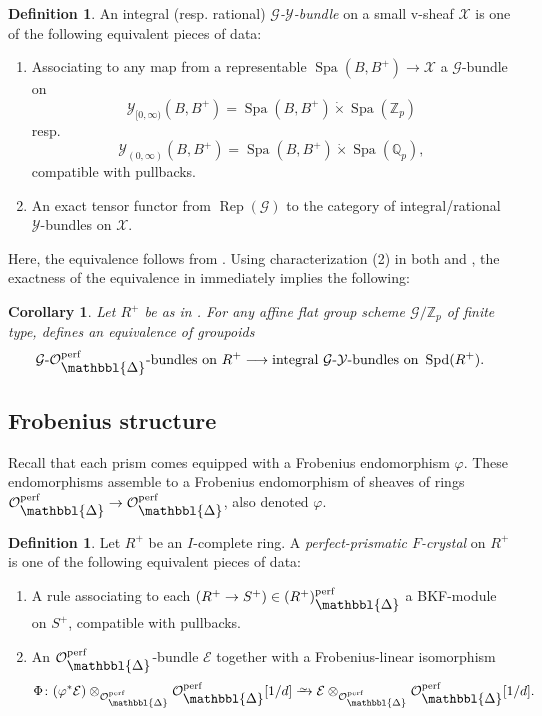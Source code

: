 \documentclass[10pt,twoside]{article}
\numberwithin{equation}{section}
\newcommand\isom{
	\xrightarrow{\smash{\raisebox{-0.65ex}{\ensuremath{\scriptstyle\sim}}}}
}
\theoremstyle{plain}
\newtheorem{mycor}[mythm]{Corollary}
\theoremstyle{definition}
\newtheorem{mydef}[mythm]{Definition}
\DeclareMathOperator{\Spa}{Spa}
\DeclareMathOperator{\Spd}{Spd}
\DeclareMathOperator{\Rep}{Rep}
\newcommand{\ZZ}{\mathbb{Z}}
\newcommand{\QQ}{\mathbb{Q}}
\newcommand{\MCE}{\mathcal{E}}
\newcommand{\MCG}{\mathcal{G}}
\newcommand{\MCO}{\mathcal{O}}
\newcommand{\MCX}{\mathcal{X}}
\newcommand{\MCY}{\mathcal{Y}}
\let \phi \varphi
\DeclareMathOperator{\perf}{perf}
\newcommand{\Prism}{{\mathlarger{\mathbbl{\Delta}}}}
\newcommand{\Yco}{\MCY_{[0,\infty)}}
\newcommand{\Yoo}{\MCY_{(0,\infty)}}
\newcommand{\OpP}{\MCO^{\perf}_{\Prism}}
\begin{document}
\begin{mydef}\label{defGYBundle}
An integral (resp. rational) \emph{\(\MCG\)-\(\MCY\)-bundle} on a small v-sheaf \(\MCX\) is one of the following equivalent pieces of data:
	\begin{enumerate}
		\item Associating to any map from a representable \(\Spa(B,B^+)\to \MCX\) a \(\MCG\)-bundle on 
        \[\Yco(B,B^+)=\Spa(B,B^+)\dot\times\Spa(\ZZ_p)\]
        resp.
        \[\Yoo(B,B^+)=\Spa(B,B^+)\dot\times\Spa(\QQ_p),\]
        compatible with pullbacks.
        \item An exact tensor functor from \(\Rep(\MCG)\) to the category of integral/rational \(\MCY\)-bundles on \(\MCX\).
	\end{enumerate}
\end{mydef}

Here, the equivalence follows from . Using characterization (2) in both  and , the exactness of the equivalence in  immediately implies the following:

\begin{mycor}\label{GEquivalenceTheorem}
Let \(R^+\) be as in . For any affine flat group scheme \(\MCG/\ZZ_p\) of finite type,  defines an equivalence of groupoids
\[\text{\emph{\(\MCG\)-\(\OpP\)-bundles on }}R^+
\longrightarrow\text{\emph{integral \(\MCG\)-\(\MCY\)-bundles on }}\Spd(R^+).\]
\end{mycor}
\subsection{Frobenius structure}
Recall that each prism comes equipped with a Frobenius endomorphism \(\phi\). These endomorphisms assemble to a Frobenius endomorphism of sheaves of rings \(\OpP\to\OpP\), also denoted \(\phi\).

\begin{mydef}
Let \(R^+\) be an \(I\)-complete ring. A \emph{perfect-prismatic \(F\)-crystal} on \(R^+\) is one of the following equivalent pieces of data:
\begin{enumerate}
    \item A rule associating to each \((R^+\to S^+)\in (R^+)_{\Prism}^{\perf}\) a BKF-module on \(S^+\), compatible with pullbacks.
    \item An \(\OpP\)-bundle \(\MCE\) together with a Frobenius-linear isomorphism 
    \[\Phi\colon(\phi^*\MCE)\otimes_{\OpP}\OpP[1/d]\isom \MCE\otimes_{\OpP}\OpP[1/d].\]
\end{enumerate}
\end{mydef}
\end{document}
